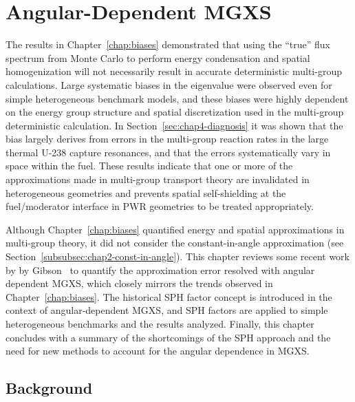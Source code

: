 \chapter{Angular-Dependent MGXS}
\label{chap:sph}

The results in Chapter~\ref{chap:biases} demonstrated that using the ``true'' flux spectrum from Monte Carlo to perform energy condensation and spatial homogenization will not necessarily result in accurate deterministic multi-group calculations. Large systematic biases in the eigenvalue were observed even for simple heterogeneous benchmark models, and these biases were highly dependent on the energy group structure and spatial discretization used in the multi-group deterministic calculation. In Section~\ref{sec:chap4-diagnosis} it was shown that the bias largely derives from errors in the multi-group reaction rates in the large thermal U-238 capture resonances, and that the errors systematically vary in space within the fuel. These results indicate that one or more of the approximations made in multi-group transport theory are invalidated in heterogeneous geometries and prevents spatial self-shielding at the fuel/moderator interface in \ac{PWR} geometries to be treated appropriately.

Although Chapter~\ref{chap:biases} quantified energy and spatial approximations in multi-group theory, it did not consider the constant-in-angle approximation (see Section~\ref{subsubsec:chap2-const-in-angle}). This chapter reviews some recent work by by Gibson~\cite{gibson2016thesis} to quantify the approximation error resolved with angular dependent \ac{MGXS}, which closely mirrors the trends observed in Chapter~\ref{chap:biases}. The historical \ac{SPH} factor concept is introduced in the context of angular-dependent \ac{MGXS}, and \ac{SPH} factors are applied to simple heterogeneous benchmarks and the results analyzed. Finally, this chapter concludes with a summary of the shortcomings of the \ac{SPH} approach and the need for new methods to account for the angular dependence in \ac{MGXS}.



\section{Background}
\label{sec:chap5-background}

